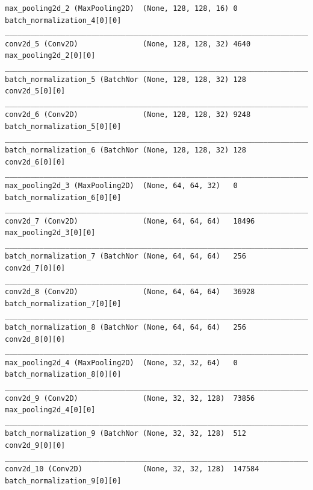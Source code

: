 \begin{lstlisting}[basicstyle=\tiny]
max_pooling2d_2 (MaxPooling2D)  (None, 128, 128, 16) 0           batch_normalization_4[0][0]      
__________________________________________________________________________________________________
conv2d_5 (Conv2D)               (None, 128, 128, 32) 4640        max_pooling2d_2[0][0]            
__________________________________________________________________________________________________
batch_normalization_5 (BatchNor (None, 128, 128, 32) 128         conv2d_5[0][0]                   
__________________________________________________________________________________________________
conv2d_6 (Conv2D)               (None, 128, 128, 32) 9248        batch_normalization_5[0][0]      
__________________________________________________________________________________________________
batch_normalization_6 (BatchNor (None, 128, 128, 32) 128         conv2d_6[0][0]                   
__________________________________________________________________________________________________
max_pooling2d_3 (MaxPooling2D)  (None, 64, 64, 32)   0           batch_normalization_6[0][0]      
__________________________________________________________________________________________________
conv2d_7 (Conv2D)               (None, 64, 64, 64)   18496       max_pooling2d_3[0][0]            
__________________________________________________________________________________________________
batch_normalization_7 (BatchNor (None, 64, 64, 64)   256         conv2d_7[0][0]                   
__________________________________________________________________________________________________
conv2d_8 (Conv2D)               (None, 64, 64, 64)   36928       batch_normalization_7[0][0]      
__________________________________________________________________________________________________
batch_normalization_8 (BatchNor (None, 64, 64, 64)   256         conv2d_8[0][0]                   
__________________________________________________________________________________________________
max_pooling2d_4 (MaxPooling2D)  (None, 32, 32, 64)   0           batch_normalization_8[0][0]      
__________________________________________________________________________________________________
conv2d_9 (Conv2D)               (None, 32, 32, 128)  73856       max_pooling2d_4[0][0]            
__________________________________________________________________________________________________
batch_normalization_9 (BatchNor (None, 32, 32, 128)  512         conv2d_9[0][0]                   
__________________________________________________________________________________________________
conv2d_10 (Conv2D)              (None, 32, 32, 128)  147584      batch_normalization_9[0][0]      

\end{lstlisting}
